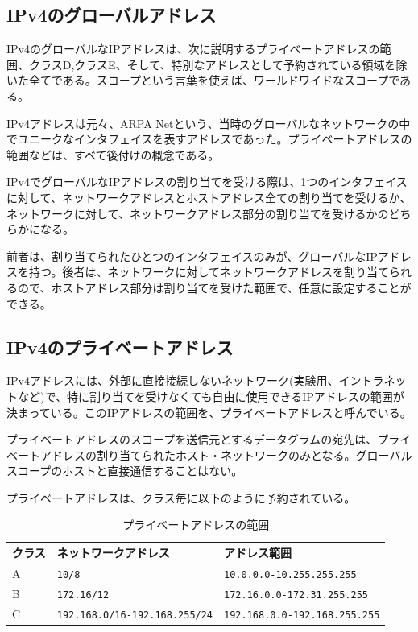 \subsection{IPv4のグローバルアドレス}
IPv4のグローバルなIPアドレスは、次に説明するプライベートアドレスの範囲、クラスD,クラスE、そして、特別なアドレスとして予約されている領域を除いた全てである。スコープという言葉を使えば、ワールドワイドなスコープである。

IPv4アドレスは元々、ARPA Netという、当時のグローバルなネットワークの中でユニークなインタフェイスを表すアドレスであった。プライベートアドレスの範囲などは、すべて後付けの概念である。

IPv4でグローバルなIPアドレスの割り当てを受ける際は、1つのインタフェイスに対して、ネットワークアドレスとホストアドレス全ての割り当てを受けるか、ネットワークに対して、ネットワークアドレス部分の割り当てを受けるかのどちらかになる。

前者は、割り当てられたひとつのインタフェイスのみが、グローバルなIPアドレスを持つ。後者は、ネットワークに対してネットワークアドレスを割り当てられるので、ホストアドレス部分は割り当てを受けた範囲で、任意に設定することができる。

\subsection{IPv4のプライベートアドレス}

IPv4アドレスには、外部に直接接続しないネットワーク(実験用、イントラネットなど)で、特に割り当てを受けなくても自由に使用できるIPアドレスの範囲が決まっている。このIPアドレスの範囲を、プライベートアドレスと呼んでいる。

プライベートアドレスのスコープを送信元とするデータグラムの宛先は、プライベートアドレスの割り当てられたホスト・ネットワークのみとなる。グローバルスコープのホストと直接通信することはない。

プライベートアドレスは、クラス毎に以下のように予約されている。

\begin{table}[hbtp] \caption{プライベートアドレスの範囲} \label{privateaddress}
\begin{center}
{\footnotesize
\begin{tabular}{lll} \toprule
クラス & ネットワークアドレス & アドレス範囲\\ \midrule
A & \verb+10/8+ & \verb+10.0.0.0-10.255.255.255+\\
B & \verb+172.16/12+ & \verb+172.16.0.0-172.31.255.255+\\
C & \verb+192.168.0/16-192.168.255/24+ & \verb+192.168.0.0-192.168.255.255+\\ \bottomrule
\end{tabular}
}
\end{center}
\end{table}

